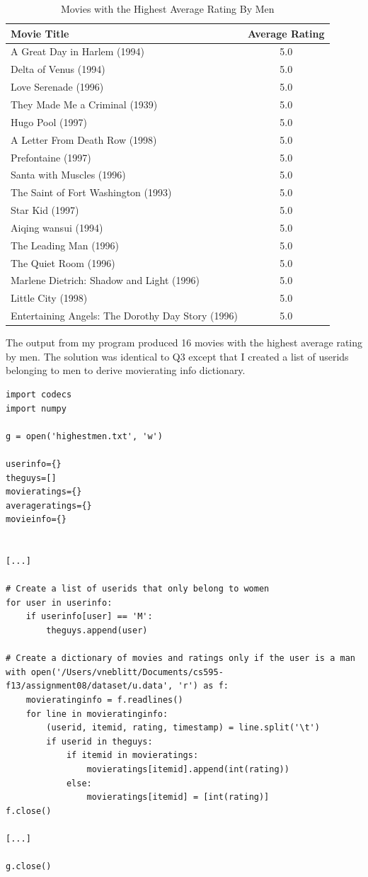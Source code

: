 \documentclass{article}
\begin{document}
\begin{table}[!h]
\centering
\begin{tabular}{l c}
Movie Title & Average Rating \\
\hline
A Great Day in Harlem (1994) & 5.0 \\
Delta of Venus (1994) & 5.0 \\
Love Serenade (1996) & 5.0 \\
They Made Me a Criminal (1939) & 5.0 \\
Hugo Pool (1997) & 5.0 \\
A Letter From Death Row (1998) & 5.0 \\
Prefontaine (1997) & 5.0 \\
Santa with Muscles (1996) & 5.0 \\
The Saint of Fort Washington (1993) & 5.0 \\
Star Kid (1997) & 5.0 \\
Aiqing wansui (1994) & 5.0 \\
The Leading Man (1996) & 5.0 \\
The Quiet Room (1996) & 5.0 \\
Marlene Dietrich: Shadow and Light (1996)  & 5.0 \\
Little City (1998) & 5.0 \\
Entertaining Angels: The Dorothy Day Story (1996) & 5.0 \\
\hline
\end{tabular}
\caption{Movies with the Highest Average Rating By Men}
\end{table}

The output from my program produced 16 movies with the highest average rating by men. The solution was identical to Q3 except that I created a list of userids belonging to men to derive movierating info dictionary.

\begin{lstlisting}[frame=single, caption=highestmen.py, label=highmen]
import codecs
import numpy

g = open('highestmen.txt', 'w')

userinfo={}
theguys=[]
movieratings={}
averageratings={}
movieinfo={}


[...]

# Create a list of userids that only belong to women
for user in userinfo:
	if userinfo[user] == 'M':
		theguys.append(user)

# Create a dictionary of movies and ratings only if the user is a man
with open('/Users/vneblitt/Documents/cs595-f13/assignment08/dataset/u.data', 'r') as f:
	movieratinginfo = f.readlines()
	for line in movieratinginfo:
		(userid, itemid, rating, timestamp) = line.split('\t')
		if userid in theguys:
			if itemid in movieratings:
				movieratings[itemid].append(int(rating))
			else:
				movieratings[itemid] = [int(rating)]
f.close()

[...]

g.close()
\end{lstlisting}
\end{document}
